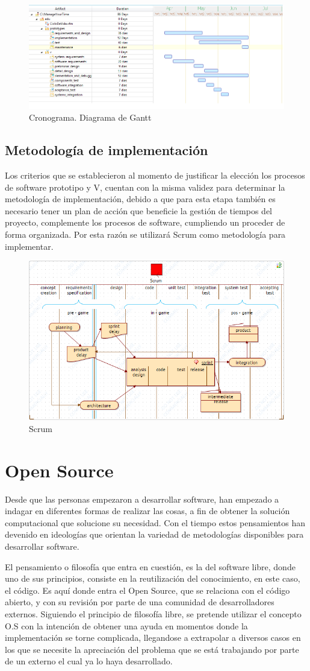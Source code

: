 \begin{figure}
	\centering
	\includegraphics[width=0.7\linewidth]{proyecto/metodologia/imgs/Gantt}
	\caption{Cronograma. Diagrama de Gantt}
	\label{fig:gantt}
\end{figure}
\subsection{Metodología de implementación}
Los criterios que se establecieron al momento de justificar la elección los procesos de software prototipo y V, cuentan con la misma validez para determinar la metodología de implementación, debido a que para esta etapa también es necesario tener un plan de acción que beneficie la gestión de tiempos del proyecto, complemente los procesos de software, cumpliendo un proceder de forma organizada. Por esta razón se utilizará Scrum como metodología para implementar.
\begin{figure}
	\centering
	\includegraphics[width=0.7\linewidth]{proyecto/metodologia/imgs/Scrum}
	\caption{Scrum}
	\label{fig:gantt}
\end{figure}
\section{Open Source}
Desde que las personas empezaron a desarrollar software, han empezado a indagar en diferentes formas de realizar las cosas, a fin de obtener la solución computacional que solucione su necesidad. Con el tiempo estos pensamientos han devenido en ideologías que orientan la variedad de metodologías disponibles para desarrollar software.

El pensamiento o filosofía que entra en cuestión, es la del software libre, donde uno de sus principios, consiste en la reutilización del conocimiento, en este caso, el código. Es aquí donde entra el Open Source, que se relaciona con el código abierto, y con su revisión por parte de una comunidad de desarrolladores externos. Siguiendo el principio de filosofía libre, se pretende utilizar el concepto O.S con la intención de obtener una ayuda en momentos donde la implementación se torne complicada, llegandose a extrapolar a diversos casos en los que se necesite la apreciación del problema que se está trabajando por parte de un externo el cual ya lo haya desarrollado.
